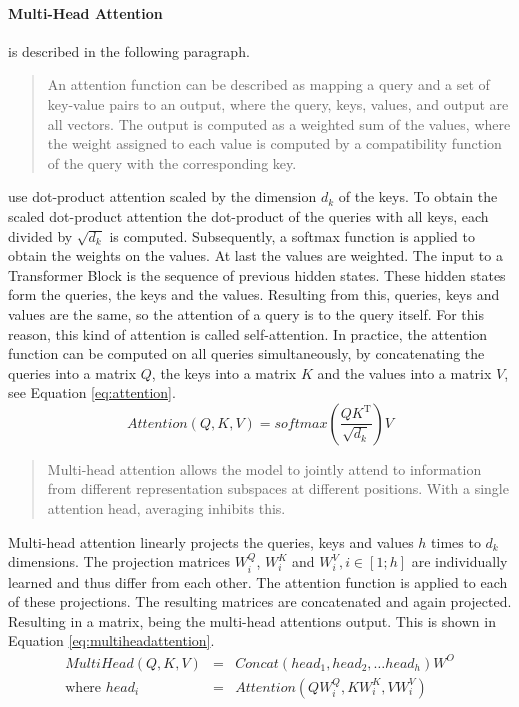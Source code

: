 	\paragraph{Multi-Head Attention} is described in the following paragraph.
	\blockcquote{Vaswani.2017}{An attention function can be described as mapping a query and a set of key-value pairs to an output, where the query, keys, values, and output are all vectors. The output is computed as a weighted sum of the values, where the weight assigned to each value is computed by a compatibility function of the query with the corresponding key.}
	\cite{Vaswani.2017} use dot-product attention \autocite{Bahdanau.2014} scaled by the dimension $d_k$ of the keys. To obtain the scaled dot-product attention the dot-product of the queries with all keys, each divided by $\sqrt{d_k}$ is computed. Subsequently, a softmax function is applied to obtain the weights on the values. At last the values are weighted. The input to a Transformer Block is the sequence of previous hidden states. These hidden states form the queries, the keys and the values. Resulting from this, queries, keys and values are the same, so the attention of a query is to the query itself. For this reason, this kind of attention is called self-attention. In practice, the attention function can be computed on all queries simultaneously, by concatenating the queries into a matrix $Q$, the keys into a matrix $K$ and the values into a matrix $V$, see Equation \eqref{eq:attention}. \autocite{Vaswani.2017}
	\begin{equation}
		\label{eq:attention}
		Attention(Q,K,V)=softmax(\frac{QK^{{\mathrm {T}}}}{\sqrt{d_k}})V
	\end{equation}
	\blockcquote{Vaswani.2017}{Multi-head attention allows the model to jointly attend to information from different representation subspaces at different positions. With a single attention head, averaging inhibits this.}
	Multi-head attention linearly projects the queries, keys and values $h$ times to $d_k$ dimensions. The projection matrices $W_i^Q$, $W_i^K$ and $W_i^V, i \in [1;h]$ are individually learned and thus differ from each other.
	The attention function is applied to each of these projections. The resulting matrices are concatenated and again projected. Resulting in a matrix, being the multi-head attentions output. This is shown in Equation \eqref{eq:multiheadattention}. \autocite{Vaswani.2017}
	\begin{equation}
		\label{eq:multiheadattention}
		\begin{array}{rcl}
			MultiHead(Q,K,V) & = & Concat(head_1, head_2, \dots head_h) W^O \\
			\text{where }head_i & = & Attention(QW_i^Q,KW_i^K,VW_i^V)
		\end{array}
	\end{equation}
